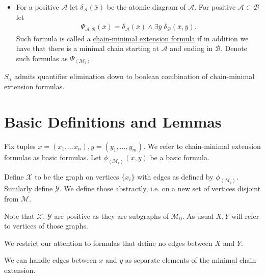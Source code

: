 \documentclass{amsart}
\newcommand{\MM}{\mathscr M}
\newcommand{\defn}{\underline}
\newcommand{\A}{\mathcal A}
\newcommand{\B}{\mathcal B}
\newcommand{\M}{\mathcal M}
\newcommand{\X}{\mathcal X}
\newcommand{\Y}{\mathcal Y}
\newcommand{\agl}[1]{\left\langle #1 \right\rangle}
\begin{document}
\begin{Definition}
\begin{itemize}
  \item For a positive $\A$ let $\delta_\A(\bar x)$ be the atomic diagram of $\A$. For positive $\A \subset \B$ let 
    \begin{align*}
      \Psi_{\A,\B}(\bar x) = \delta_\A(\bar x) \wedge \exists \bar y \; \delta_\B(\bar x, \bar y).
    \end{align*}
    Such formula is called a \defn{chain-minimal extension formula} if in addition we have that there is a minimal chain starting at 
    $\A$ and ending in $\B$.
    Denote such formulas as $\Psi_{\agl{\M_i}}$.
  \end{itemize}
\end{Definition}

\begin{Theorem} 
  $S_\alpha$ admits quantifier elimination down to boolean combination of chain-minimal extension formulas.
\end{Theorem}


\section{Basic Definitions and Lemmas}

Fix tuples $x = (x_1, \ldots x_n), y = (y_1, \ldots, y_m)$.
We refer to chain-minimal extension formulas as basic formulas.
Let $\phi_{\agl{\M_i}}(x, y)$ be a basic formula.

\begin{Definition}
  Define $\X$ to be the graph on vertices $\{x_i\}$ with edges as defined by $\phi_{\agl{\M_i}}$.
  Similarly define $\Y$.
  We define those abstractly, i.e. on a new set of vertices disjoint from $\MM$.
\end{Definition}

Note that $\X$, $\Y$ are positive as they are subgraphs of $\M_0$.
As usual $X, Y$ will refer to vertices of those graphs.

We restrict our attention to formulas that define no edges between $X$ and $Y$.

\begin{Note} \label{note_edges}
  We can handle edges between $x$ and $y$ as separate elements of the minimal chain extension.
\end{Note}
\end{document}
